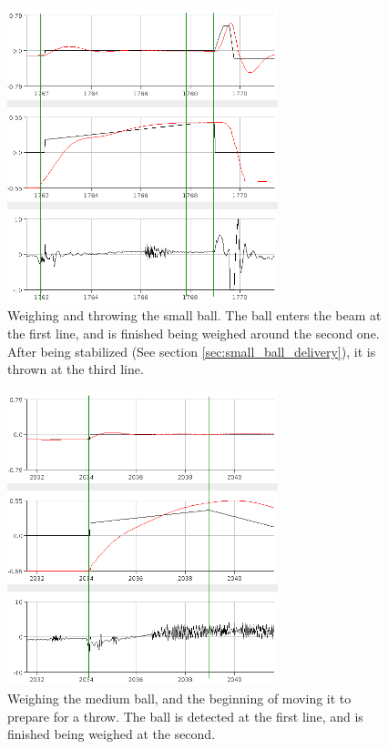 \begin{figure}[h]
\centering
\includegraphics[width=0.7\textwidth]{figures/weighandthrowsmallball-crop.png}
\caption{Weighing and throwing the small ball. The ball enters the beam at the first line, and is finished being weighed around the second one. After being stabilized (See section \ref{sec:small_ball_delivery}), it is thrown at the third line.}
\label{fig:weighandthrowsmallball}
\end{figure}

\begin{figure}[h]
\centering
\includegraphics[width=0.7\textwidth]{figures/weighmediumball-crop.png}
\caption{Weighing the medium ball, and the beginning of moving it to prepare for a throw. The ball is detected at the first line, and is finished being weighed at the second.}
\label{fig:weighmediumball}
\end{figure}


